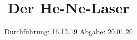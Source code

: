
\setlength{\parindent}{0 pt}

\subject{V61}
\title{Der He-Ne-Laser}
\date{%
  Durchführung: 16.12.19
  \hspace{3em}
  Abgabe: 20.01.20
}



\maketitle
\thispagestyle{empty}
\tableofcontents
\newpage






\printbibliography{}


